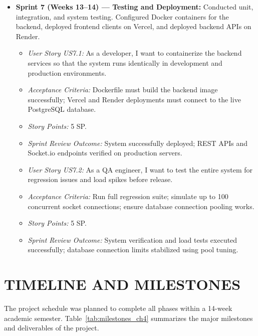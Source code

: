 \documentclass[12,Times new Roman,a4paper]{report}
\begin{document}
\begin{itemize}
    \item \textbf{Sprint 7 (Weeks 13--14) --- Testing and Deployment:} Conducted unit, integration, and system testing. Configured Docker containers for the backend, deployed frontend clients on Vercel, and deployed backend APIs on Render.
    \begin{itemize}
        \item \textit{User Story US7.1:} As a developer, I want to containerize the backend services so that the system runs identically in development and production environments.
        \item \textit{Acceptance Criteria:} Dockerfile must build the backend image successfully; Vercel and Render deployments must connect to the live PostgreSQL database.
        \item \textit{Story Points:} 5 SP.
        \item \textit{Sprint Review Outcome:} System successfully deployed; REST APIs and Socket.io endpoints verified on production servers.
    \end{itemize}
    \begin{itemize}
        \item \textit{User Story US7.2:} As a QA engineer, I want to test the entire system for regression issues and load spikes before release.
        \item \textit{Acceptance Criteria:} Run full regression suite; simulate up to 100 concurrent socket connections; ensure database connection pooling works.
        \item \textit{Story Points:} 5 SP.
        \item \textit{Sprint Review Outcome:} System verification and load tests executed successfully; database connection limits stabilized using pool tuning.
    \end{itemize}
\end{itemize}

\section{TIMELINE AND MILESTONES}
The project schedule was planned to complete all phases within a 14-week academic semester. Table~\ref{tab:milestones_ch4} summarizes the major milestones and deliverables of the project.
\end{document}
